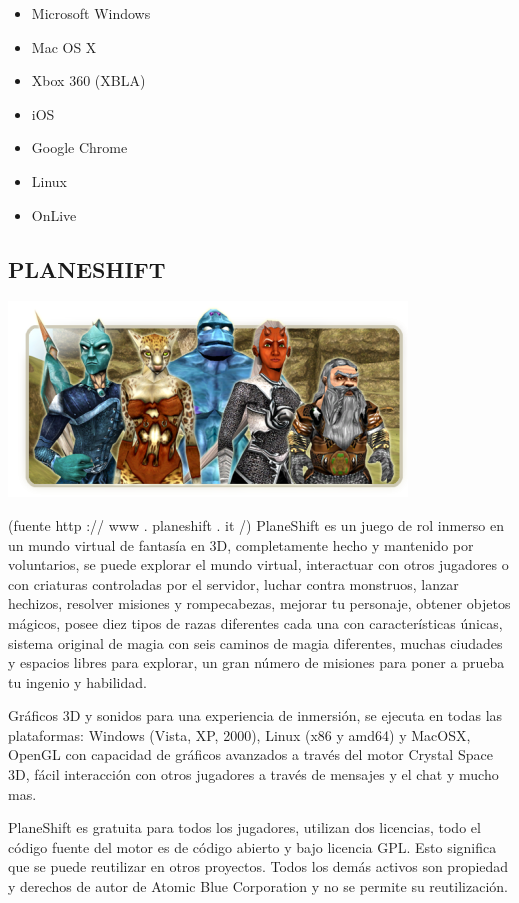 \begin{itemize}
\item Microsoft Windows
\item Mac OS X
\item Xbox 360 (XBLA)
\item iOS
\item Google Chrome
\item Linux
\item OnLive
\end{itemize}

\subsection*{PLANESHIFT}
\includegraphics[scale=0.5]{img/cp07/img0703.png}

(fuente http :// www . planeshift . it /)
PlaneShift es un juego de rol inmerso en un mundo virtual de
fantasía en 3D, completamente hecho y mantenido por
voluntarios, se puede explorar el mundo virtual, interactuar con
otros jugadores o con criaturas controladas por el servidor,
luchar contra monstruos, lanzar hechizos, resolver misiones y
rompecabezas, mejorar tu personaje, obtener objetos mágicos,
posee diez tipos de razas diferentes cada una con características
únicas, sistema original de magia con seis caminos de magia
diferentes, muchas ciudades y espacios libres para explorar, un
gran número de misiones para poner a prueba tu ingenio y
habilidad.

Gráficos 3D y sonidos para una experiencia de inmersión, se
ejecuta en todas las plataformas: Windows (Vista, XP, 2000),
Linux (x86 y amd64) y MacOSX, OpenGL con capacidad de
gráficos avanzados a través del motor Crystal Space 3D,
fácil interacción con otros jugadores a través de mensajes y el
chat y mucho mas.

PlaneShift es gratuita para todos los jugadores, utilizan dos
licencias, todo el código fuente del motor es de código abierto y
bajo licencia GPL. Esto significa que se puede reutilizar en otros
proyectos. Todos los demás activos son propiedad y derechos de
autor de Atomic Blue Corporation y no se permite su
reutilización.

